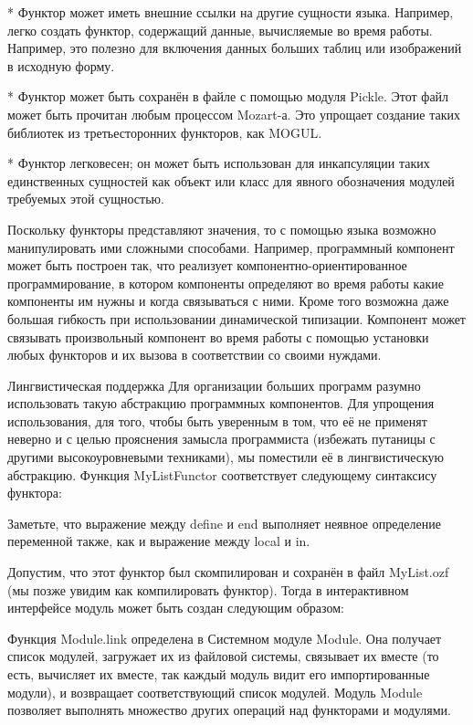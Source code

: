 * Функтор может иметь внешние ссылки на другие сущности языка. Например, легко создать функтор, содержащий данные, вычисляемые во время работы. Например, это полезно для включения данных больших таблиц или изображений в исходную форму.

* Функтор может быть сохранён в файле с помощью модуля Pickle. Этот файл может быть прочитан любым процессом Mozart-а. Это упрощает создание таких библиотек из третьесторонних функторов, как MOGUL.

* Функтор легковесен; он может быть использован для инкапсуляции таких единственных сущностей как объект или класс для явного обозначения модулей требуемых этой сущностью.

Поскольку функторы представляют значения, то с помощью языка возможно манипулировать ими сложными способами. Например, программный компонент может быть построен так, что реализует компонентно-ориентированное программирование, в котором компоненты определяют во время работы какие компоненты им нужны и когда связываться с ними. Кроме того возможна даже большая гибкость при использовании динамической типизации. Компонент может связывать произвольный компонент во время работы с помощью установки любых функторов и их вызова в соответствии со своими нуждами.

Лингвистическая поддержка Для организации больших программ разумно использовать такую абстракцию программных компонентов. Для упрощения использования, для того, чтобы быть уверенным в том, что её не применят неверно и с целью прояснения замысла программиста (избежать путаницы с другими высокоуровневыми техниками), мы поместили её в лингвистическую абстракцию. Функция MyListFunctor соответствует следующему синтаксису функтора:

Заметьте, что выражение между define и end выполняет неявное определение переменной также, как и выражение между local и in.

Допустим, что этот функтор был скомпилирован и сохранён в файл MyList.ozf (мы позже увидим как компилировать функтор). Тогда в интерактивном интерфейсе модуль может быть создан следующим образом:

Функция Module.link определена в Системном модуле Module. Она получает список модулей, загружает их из файловой системы, связывает их вместе (то есть, вычисляет их вместе, так каждый модуль видит его импортированные модули), и возвращает соответствующий список модулей. Модуль Module позволяет выполнять множество других операций над функторами и модулями.

